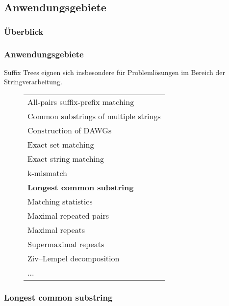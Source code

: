 \documentclass{beamer}
\begin{document}
\subsection{Anwendungsgebiete}

\subsubsection{Überblick}

\begin{frame}
\frametitle{Anwendungsgebiete}
Suffix Trees eignen sich insbesondere für Problemlösungen im Bereich der Stringverarbeitung.
\begin{figure}
\begin{tabular}{l}
    \toprule
    All-pairs suffix-prefix matching      \\
    Common substrings of multiple strings \\
    Construction of DAWGs                 \\
    Exact set matching                    \\
    Exact string matching                 \\
    k-mismatch                            \\
    \textbf{Longest common substring}     \\
    Matching statistics                   \\
    Maximal repeated pairs                \\
    Maximal repeats                       \\
    Supermaximal repeats                  \\
    Ziv–Lempel decomposition              \\
    ...                                   \\
    \bottomrule
\end{tabular}
\end{figure}
\end{frame}

\subsubsection{Longest common substring}
\end{document}
